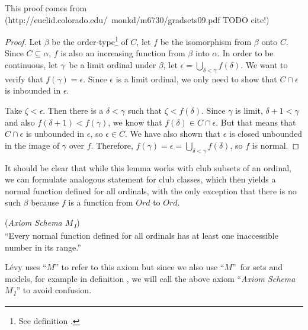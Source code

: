 This proof comes from (http://euclid.colorado.edu/~monkd/m6730/gradsets09.pdf TODO cite!)
\begin{proof}
\bce[(i)]
\item Let $\beta$ be the order-type\footnote{See definition .} of $C$, let $f$ be the isomorphism from $\beta$ onto $C$. Since $C \subseteq \alpha$, $f$ is also an increasing function from $\beta$ into $\alpha$. In order to be continuous, let $\gamma$ be a limit ordinal under $\beta$, let $\epsilon = \bigcup_{\delta<\gamma} f(\delta)$. We want to verify that $f(\gamma) = \epsilon$. Since $\epsilon$ is a limit ordinal, we only need to show that $C \cap \epsilon$ is inbounded in $\epsilon$.

Take $\zeta < \epsilon$. Then there is a $\delta < \gamma$ such that $\zeta < f(\delta)$. 
Since $\gamma$ is limit, $\delta + 1 < \gamma$ and also $f(\delta + 1) < f(\gamma)$, we know that $f(\delta) \in C \cap \epsilon$. 
But that means that $C \cap \epsilon$ is unbounded in $\epsilon$, so $\epsilon \in C$. We have also shown that $\epsilon$ is closed unbounded in the image of $\gamma$ over $f$.
Therefore, $f(\gamma) = \epsilon = \bigcup_{\delta < \gamma} f(\delta)$, so $f$ is normal.

\ece
\end{proof}
It should be clear that while this lemma works with club subsets of an ordinal, we can formulate analogous statement for club classes, which then yields a normal function defined for all ordinals, with the only exception that there is no such $\beta$ because $f$ is a function from $Ord$ to $Ord$.


\begin{definition}{(\emph{Axiom Schema $M$\textsubscript{1}})}\label{def:levy_m}\\
``Every normal function defined for all ordinals has at least one inaccessible number in its range.''
\end{definition}
Lévy uses ``$M$'' to refer to this axiom but since we also use ``$M$'' for sets and models, for example in definition , we will call the above axiom ``\emph{Axiom Schema $M$\textsubscript{1}}'' to avoid confusion.


